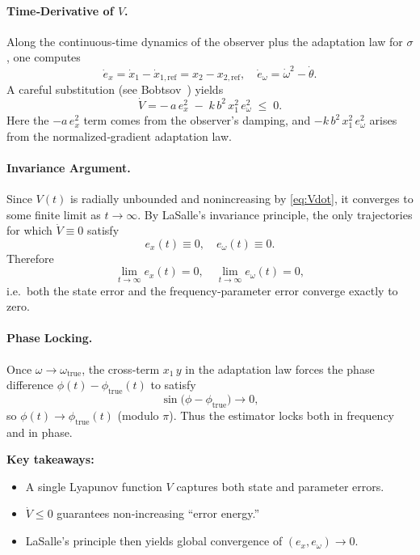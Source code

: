 \documentclass{article}
\begin{document}
\paragraph{Time‐Derivative of \(V\).}
Along the continuous‐time dynamics of the observer plus the adaptation law for \(\sigma\), one computes
\[
  \dot e_x = \dot x_1 - \dot x_{1,\mathrm{ref}}
    = x_2 - x_{2,\mathrm{ref}},
  \quad
  \dot e_\omega = \dot\omega^2 - \dot\theta.
\]
A careful substitution (see Bobtsov~\cite{Bobtsov2013}) yields
\begin{equation}\label{eq:Vdot}
  \dot V 
  = -\,a\,e_x^2 \;-\; k\,b^2\,x_1^2\,e_\omega^2
  \;\le\; 0.
\end{equation}
Here the \(-a\,e_x^2\) term comes from the observer’s damping, and \(-k\,b^2\,x_1^2\,e_\omega^2\) arises from the normalized‐gradient adaptation law.

\paragraph{Invariance Argument.}
Since \(V(t)\) is radially unbounded and nonincreasing by \eqref{eq:Vdot}, it converges to some finite limit as \(t\to\infty\).  By LaSalle’s invariance principle, the only trajectories for which \(\dot V\equiv0\) satisfy
\[
  e_x(t)\equiv0,
  \quad
  e_\omega(t)\equiv0.
\]
Therefore
\[
  \lim_{t\to\infty} e_x(t) = 0,
  \quad
  \lim_{t\to\infty} e_\omega(t) = 0,
\]
i.e.\ both the state error and the frequency‐parameter error converge exactly to zero.

\paragraph{Phase Locking.}
Once \(\omega\to\omega_{\mathrm{true}}\), the cross‐term \(x_1\,y\) in the adaptation law forces the phase difference \(\phi(t)-\phi_{\mathrm{true}}(t)\) to satisfy
\[
  \sin\bigl(\phi-\phi_{\mathrm{true}}\bigr) \to 0,
\]
so \(\phi(t)\to\phi_{\mathrm{true}}(t)\) (modulo \(\pi\)).  Thus the estimator locks both in frequency and in phase.

\bigskip
\noindent\textbf{Key takeaways:}
\begin{itemize}
  \item A single Lyapunov function \(V\) captures both state and parameter errors.
  \item \(\dot V\le0\) guarantees non‐increasing “error energy.”
  \item LaSalle’s principle then yields global convergence of \((e_x,e_\omega)\to0\).
\end{itemize}
\end{document}

